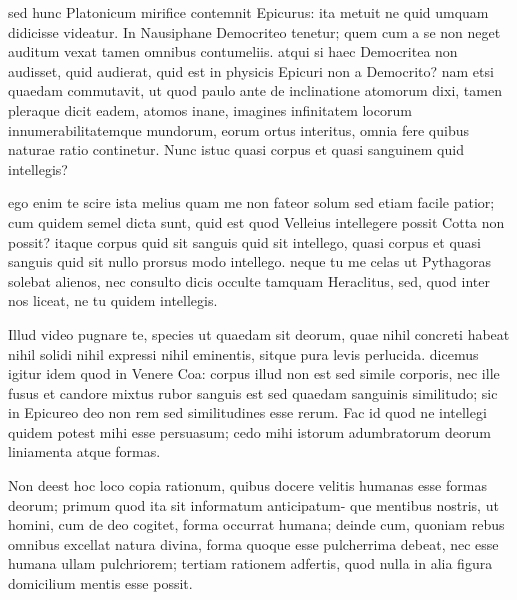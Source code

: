  sed hunc Platonicum mirifice contemnit Epicurus: ita metuit ne quid umquam didicisse videatur. In Nausiphane Democriteo tenetur; quem cum a se non neget auditum vexat tamen omnibus contumeliis. atqui si haec Democritea non audisset, quid audierat, quid est in physicis Epicuri non a Democrito? nam etsi quaedam commutavit, ut quod paulo ante de inclinatione atomorum dixi, tamen pleraque dicit eadem, atomos inane, imagines infinitatem locorum innumerabilitatemque mundorum, eorum ortus interitus, omnia fere quibus naturae ratio continetur. Nunc istuc quasi corpus et quasi sanguinem quid intellegis?

 ego enim te scire ista melius quam me non fateor solum sed etiam facile patior; cum quidem semel dicta sunt, quid est quod Velleius intellegere possit Cotta non possit? itaque corpus quid sit sanguis quid sit intellego, quasi corpus et quasi sanguis quid sit nullo prorsus modo intellego. neque tu me celas ut Pythagoras solebat alienos, nec consulto dicis occulte tamquam Heraclitus, sed, quod inter nos liceat, ne tu quidem intellegis.

 Illud video pugnare te, species ut quaedam sit deorum, quae nihil concreti habeat nihil solidi nihil expressi nihil eminentis, sitque pura levis perlucida. dicemus igitur idem quod in Venere Coa: corpus illud non est sed simile corporis, nec ille fusus et candore mixtus rubor sanguis est sed quaedam sanguinis similitudo; sic in Epicureo deo non rem sed similitudines esse rerum. Fac id quod ne intellegi quidem potest mihi esse persuasum; cedo mihi istorum adumbratorum deorum liniamenta atque formas.

 Non deest hoc loco copia rationum, quibus docere velitis humanas esse formas deorum; primum quod ita sit informatum anticipatum- que mentibus nostris, ut homini, cum de deo cogitet, forma occurrat humana; deinde cum, quoniam rebus omnibus excellat natura divina, forma quoque esse pulcherrima debeat, nec esse humana ullam pulchriorem; tertiam rationem adfertis, quod nulla in alia figura domicilium mentis esse possit.

